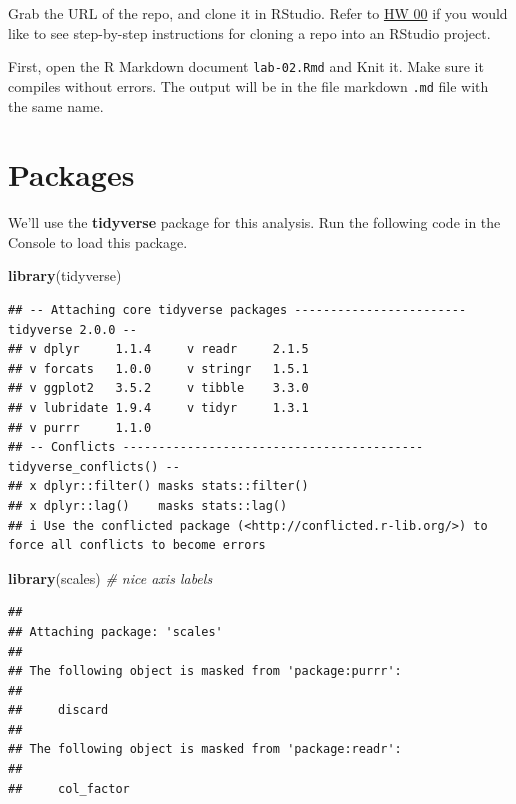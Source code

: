 \documentclass[
]{article}
\newenvironment{Shaded}{\begin{snugshade}}{\end{snugshade}}
\newcommand{\CommentTok}[1]{\textcolor[rgb]{0.56,0.35,0.01}{\textit{#1}}}
\newcommand{\FunctionTok}[1]{\textcolor[rgb]{0.13,0.29,0.53}{\textbf{#1}}}
\newcommand{\NormalTok}[1]{#1}
\begin{document}
Grab the URL of the repo, and clone it in RStudio. Refer to
\href{https://ids-s1-20.github.io/homework/hw-00/hw-00-pet-names.html}{HW
00} if you would like to see step-by-step instructions for cloning a
repo into an RStudio project.

First, open the R Markdown document \texttt{lab-02.Rmd} and Knit it.
Make sure it compiles without errors. The output will be in the file
markdown \texttt{.md} file with the same name.

\section{Packages}\label{packages}

We'll use the \textbf{tidyverse} package for this analysis. Run the
following code in the Console to load this package.

\begin{Shaded}
\begin{Highlighting}[]
\FunctionTok{library}\NormalTok{(tidyverse)}
\end{Highlighting}
\end{Shaded}

\begin{verbatim}
## -- Attaching core tidyverse packages ------------------------ tidyverse 2.0.0 --
## v dplyr     1.1.4     v readr     2.1.5
## v forcats   1.0.0     v stringr   1.5.1
## v ggplot2   3.5.2     v tibble    3.3.0
## v lubridate 1.9.4     v tidyr     1.3.1
## v purrr     1.1.0     
## -- Conflicts ------------------------------------------ tidyverse_conflicts() --
## x dplyr::filter() masks stats::filter()
## x dplyr::lag()    masks stats::lag()
## i Use the conflicted package (<http://conflicted.r-lib.org/>) to force all conflicts to become errors
\end{verbatim}

\begin{Shaded}
\begin{Highlighting}[]
\FunctionTok{library}\NormalTok{(scales) }\CommentTok{\# nice axis labels}
\end{Highlighting}
\end{Shaded}

\begin{verbatim}
## 
## Attaching package: 'scales'
## 
## The following object is masked from 'package:purrr':
## 
##     discard
## 
## The following object is masked from 'package:readr':
## 
##     col_factor
\end{verbatim}
\end{document}
